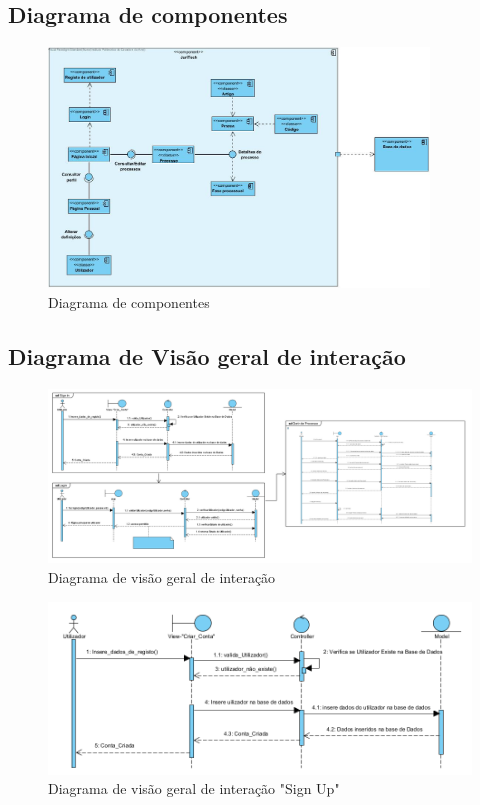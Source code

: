 \subsection{Diagrama de componentes}
\begin{figure}[!h]
\centering
\includegraphics[width=0.9\textwidth]{Figuras/d.componentes.jpg}
\caption{Diagrama de componentes}
\label{d.componentes}
\end{figure}
\newpage

\subsection{Diagrama de Visão geral de interação}
\begin{figure}[!h]
\centering
\includegraphics[width=1.1\textwidth]{Figuras/d. visão geral de interação.png}
\caption{Diagrama de visão geral de interação}
\label{d.componentes}
\end{figure}

\begin{figure}[!h]
\centering
\includegraphics[width=1.1\textwidth]{Figuras/d. visão geral de interação_sign up.png}
\caption{Diagrama de visão geral de interação "Sign Up"}
\label{d.componentes}
\end{figure}

